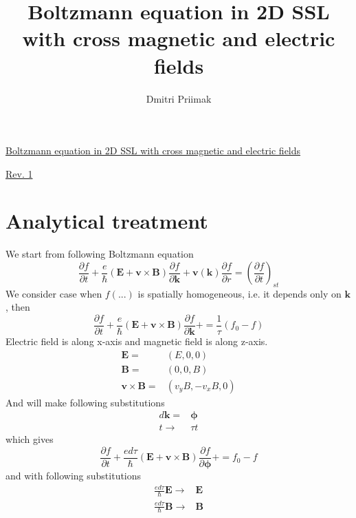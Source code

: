 \documentclass[40pt,letterpaper]{article}
\author{Dmitri Priimak}
\title{Boltzmann equation in 2D SSL with cross magnetic and electric fields}
\begin{document}
 \begin{center}
  \underline{Boltzmann equation in 2D SSL with cross magnetic and electric fields}
 \end{center}
  \begin{center}
    \underline{Rev. 1}
  \end{center}
  \section{Analytical treatment}
    We start from following Boltzmann equation
    \begin{equation}\label{eq:boltzmann}
     \frac{\partial f}{\partial t}+
     \frac{e}{\hbar}\left ( \mathbf{E} + \mathbf{v}\times\mathbf{B} \right ) \frac{\partial f}{\partial\mathbf{k}}+
     \mathbf{v}(\mathbf{k})\frac{\partial f}{\partial r} = \left ( \frac{\partial f}{\partial t} \right )_{st}
    \end{equation}
    We consider case when $f(...)$ is spatially homogeneous, i.e. it depends only on $\mathbf{k}$, then
    \begin{equation}\label{eq:boltzmann_homo}
     \frac{\partial f}{\partial t}+
     \frac{e}{\hbar}\left ( \mathbf{E} + \mathbf{v}\times\mathbf{B} \right ) \frac{\partial f}{\partial\mathbf{k}}+
     = \frac{1}{\tau}\left ( f_0 - f \right )
    \end{equation}
    Electric field is along x-axis and magnetic field is along z-axis.
    \begin{align}
     \mathbf{E}=&(E,0,0) \\
     \mathbf{B}=&(0,0,B) \\
     \mathbf{v}\times\mathbf{B}=&(v_y B, -v_x B, 0)
    \end{align}
    And will make following substitutions
    \begin{align}
     d\mathbf{k}=&\mathbf{\phi} \\
     t \to & \tau t
    \end{align}
    which gives
    \begin{equation}
     \frac{\partial f}{\partial t}+
     \frac{ed\tau}{\hbar}\left ( \mathbf{E} + \mathbf{v}\times\mathbf{B} \right ) \frac{\partial f}{\partial\mathbf{\phi}}+
     = f_0 - f
    \end{equation}
    and with following substitutions
    \begin{align}
     \frac{ed\tau}{\hbar}\mathbf{E}\to & \mathbf{E} \\     
     \frac{ed\tau}{\hbar}\mathbf{B}\to & \mathbf{B}
    \end{align}
\end{document}
